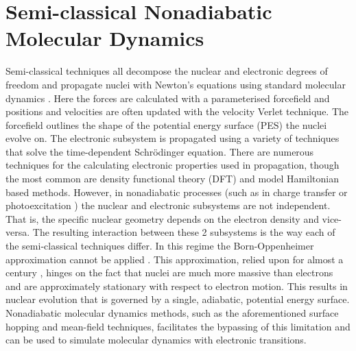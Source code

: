 \section{Semi-classical Nonadiabatic Molecular Dynamics}
Semi-classical techniques all decompose the nuclear and electronic degrees of freedom and propagate nuclei with Newton's equations using standard molecular dynamics \cite{Coker1995Jan}. Here the forces are calculated with a parameterised forcefield and positions and velocities are often updated with the velocity Verlet technique. The forcefield outlines the shape of the potential energy surface (PES) the nuclei evolve on. The electronic subsystem is propagated using a variety of techniques that solve the time-dependent Schr\"odinger equation. There are numerous techniques for the calculating electronic properties used in propagation, though the most common are density functional theory (DFT) and model Hamiltonian based methods. However, in nonadiabatic processes (such as in charge transfer \cite{PhysRevB.79.115203} or photoexcitation \cite{Hammes-Schiffer2001Apr, Hammes-Schiffer1994Sep, Huynh2007}) the nuclear and electronic subsystems are not independent. That is, the specific nuclear geometry depends on the electron density and vice-versa. The resulting interaction between these 2 subsystems is the way each of the semi-classical techniques differ. In this regime the Born-Oppenheimer approximation cannot be applied \cite{john_c._tully_nonadiabatic_nodate}. This approximation, relied upon for almost a century \cite{Pisana2007Feb}, hinges on the fact that nuclei are much more massive than electrons and are approximately stationary with respect to electron motion\cite{Born1927Jan}. This results in nuclear evolution that is governed by a single, adiabatic, potential energy surface. Nonadiabatic molecular dynamics methods, such as the aforementioned surface hopping and mean-field techniques, facilitates the bypassing of this limitation and can be used to simulate molecular dynamics with electronic transitions. 
\\\\
